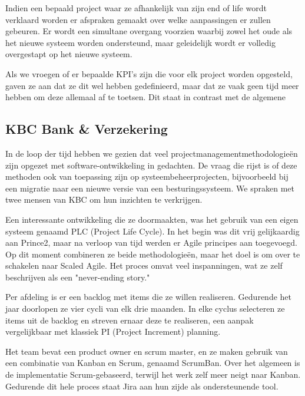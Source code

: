 \documentclass[dutch]{hogent-article}
\begin{document}
Indien een bepaald project waar ze afhankelijk van zijn end of life wordt verklaard worden er afspraken gemaakt over welke aanpassingen er zullen gebeuren. Er wordt een simultane overgang voorzien waarbij zowel het oude als het nieuwe systeem worden ondersteund, maar geleidelijk wordt er volledig overgestapt op het nieuwe systeem.
\newline

Als we vroegen of er bepaalde KPI's zijn die voor elk project worden opgesteld, gaven ze aan dat ze dit wel hebben gedefinieerd, maar dat ze vaak geen tijd meer hebben om deze allemaal af te toetsen. Dit staat in contrast met de algemene

\subsection{KBC Bank \& Verzekering}
\label{ssec:interview-kbc}

In de loop der tijd hebben we gezien dat veel projectmanagementmethodologieën zijn opgezet met software-ontwikkeling in gedachten. De vraag die rijst is of deze methoden ook van toepassing zijn op systeembeheerprojecten, bijvoorbeeld bij een migratie naar een nieuwe versie van een besturingssysteem. We spraken met twee mensen van KBC om hun inzichten te verkrijgen.
\newline

Een interessante ontwikkeling die ze doormaakten, was het gebruik van een eigen systeem genaamd PLC (Project Life Cycle). In het begin was dit vrij gelijkaardig aan Prince2, maar na verloop van tijd werden er Agile principes aan toegevoegd. Op dit moment combineren ze beide methodologieën, maar het doel is om over te schakelen naar Scaled Agile. Het proces omvat veel inspanningen, wat ze zelf beschrijven als een "never-ending story."
\newline

Per afdeling is er een backlog met items die ze willen realiseren. Gedurende het jaar doorlopen ze vier cycli van elk drie maanden. In elke cyclus selecteren ze items uit de backlog en streven ernaar deze te realiseren, een aanpak vergelijkbaar met klassiek PI (Project Increment) planning.
\newline

Het team bevat een product owner en scrum master, en ze maken gebruik van een combinatie van Kanban en Scrum, genaamd ScrumBan. Over het algemeen is de implementatie Scrum-gebaseerd, terwijl het werk zelf meer neigt naar Kanban. Gedurende dit hele proces staat Jira aan hun zijde als ondersteunende tool.
\newline
\end{document}
